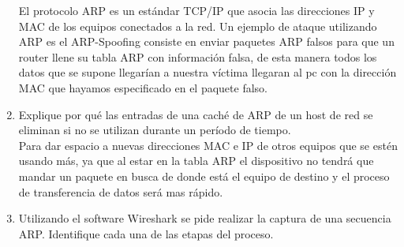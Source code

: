 \documentclass{udparticle}
\begin{document}
\begin{enumerate}
    El protocolo ARP es un estándar TCP/IP que asocia las direcciones IP y MAC de los equipos conectados a la red. Un ejemplo de
    ataque utilizando ARP es el ARP-Spoofing consiste en enviar paquetes ARP falsos para que un router llene su tabla ARP con
    información falsa, de esta manera todos los datos que se supone llegarían a nuestra víctima llegaran al pc con la dirección MAC
    que hayamos especificado en el paquete falso.\\
    \item Explique por qué las entradas de una caché de ARP de un host de red se eliminan si no se
    utilizan durante un período de tiempo.\\
    Para dar espacio a nuevas direcciones MAC e IP de otros equipos que se estén usando más, ya que al estar en la tabla ARP el
    dispositivo no tendrá que mandar un paquete en busca de donde está el equipo de destino y el proceso de transferencia de datos
    será mas rápido.\\
    \item Utilizando el software Wireshark se pide realizar la captura de una secuencia ARP. Identifique
    cada una de las etapas del proceso.\\
    

\end{enumerate}
\end{document}
